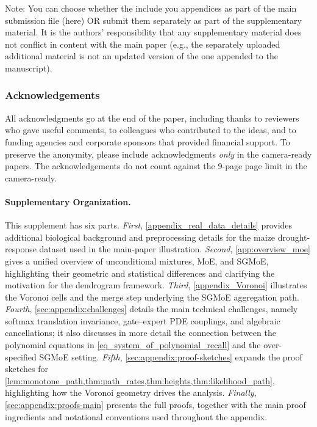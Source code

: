 \documentclass[twoside]{article}
\theoremstyle{plain}
\theoremstyle{definition}
\theoremstyle{plain}
\begin{document}
Note: You can choose whether the include you appendices as part of the main submission file (here) OR submit them separately as part of the supplementary material. It is the authors' responsibility that any supplementary material does not conflict in content with the main paper (e.g., the separately uploaded additional material is not an updated version of the one appended to the manuscript).

\subsubsection*{Acknowledgements}
All acknowledgments go at the end of the paper, including thanks to reviewers who gave useful comments, to colleagues who contributed to the ideas, and to funding agencies and corporate sponsors that provided financial support. 
To preserve the anonymity, please include acknowledgments \emph{only} in the camera-ready papers. The acknowledgements do not count against the 9-page page limit in the camera-ready.

\fi

\onecolumn
{}

\paragraph{Supplementary Organization.}
This supplement has six parts. \emph{First}, \cref{appendix_real_data_details} provides additional biological background and preprocessing details for the maize drought-response dataset used in the main-paper illustration. \emph{Second}, \cref{app:overview_moe} gives a unified overview of unconditional mixtures, MoE, and SGMoE, highlighting their geometric and statistical differences and clarifying the motivation for the dendrogram framework. \emph{Third}, \cref{appendix_Voronoi} illustrates the Voronoi cells and the merge step underlying the SGMoE aggregation path. \emph{Fourth}, \cref{sec:appendix:challenges} details the main technical challenges, namely softmax translation invariance, gate--expert PDE couplings, and algebraic cancellations; it also discusses in more detail the connection between the polynomial equations in \cref{eq_system_of_polynomial_recall} and the over-specified SGMoE setting. \emph{Fifth}, \cref{sec:appendix:proof-sketches} expands the proof sketches for \cref{lem:monotone_path,thm:path_rates,thm:heights,thm:likelihood_path}, highlighting how the Voronoi geometry drives the analysis. \emph{Finally}, \cref{sec:appendix:proofs-main} presents the full proofs, together with the main proof ingredients and notational conventions used throughout the appendix.
\end{document}
